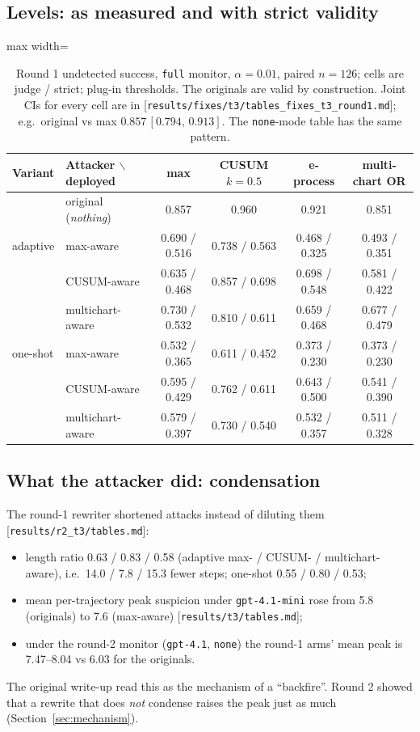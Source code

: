 \documentclass[11pt]{article}
\newcommand{\src}[1]{{\footnotesize\textcolor{ink2}{[\nolinkurl{#1}]}}}
\newcommand{\ci}[2]{\,[#1,\,#2]}
\begin{document}
\subsection{Levels: as measured and with strict validity}

\begin{table}[H]\centering\small
\begin{adjustbox}{max width=\linewidth}
\begin{tabular}{@{}llcccc@{}}
\toprule
Variant & Attacker $\backslash$ deployed & max & CUSUM $k{=}0.5$ & e-process & multi-chart OR\\
\midrule
& original (\emph{nothing}) & 0.857 & 0.960 & 0.921 & 0.851\\
\midrule
adaptive & max-aware & 0.690 / 0.516 & 0.738 / 0.563 & 0.468 / 0.325 & 0.493 / 0.351\\
& CUSUM-aware & 0.635 / 0.468 & 0.857 / 0.698 & 0.698 / 0.548 & 0.581 / 0.422\\
& multichart-aware & 0.730 / 0.532 & 0.810 / 0.611 & 0.659 / 0.468 & 0.677 / 0.479\\
\midrule
one-shot & max-aware & 0.532 / 0.365 & 0.611 / 0.452 & 0.373 / 0.230 & 0.373 / 0.230\\
& CUSUM-aware & 0.595 / 0.429 & 0.762 / 0.611 & 0.643 / 0.500 & 0.541 / 0.390\\
& multichart-aware & 0.579 / 0.397 & 0.730 / 0.540 & 0.532 / 0.357 & 0.511 / 0.328\\
\bottomrule
\end{tabular}
\end{adjustbox}
\caption{Round 1 undetected success, \texttt{full} monitor, $\alpha=0.01$, paired $n=126$; cells are judge / strict; plug-in thresholds. The originals are valid by construction. Joint CIs for every cell are in \src{results/fixes/t3/tables_fixes_t3_round1.md}; e.g.\ original vs max $0.857\ci{0.794}{0.913}$. The \texttt{none}-mode table has the same pattern.}\label{tab:r1levels}
\end{table}


\subsection{What the attacker did: condensation}
The round-1 rewriter shortened attacks instead of diluting them \src{results/r2_t3/tables.md}:
\begin{itemize}
\item length ratio 0.63 / 0.83 / 0.58 (adaptive max- / CUSUM- / multichart-aware), i.e.\ 14.0 / 7.8 / 15.3 fewer steps; one-shot 0.55 / 0.80 / 0.53;
\item mean per-trajectory peak suspicion under \texttt{gpt-4.1-mini} rose from 5.8 (originals) to 7.6 (max-aware) \src{results/t3/tables.md};
\item under the round-2 monitor (\texttt{gpt-4.1}, \texttt{none}) the round-1 arms' mean peak is 7.47--8.04 vs 6.03 for the originals.
\end{itemize}
The original write-up read this as the mechanism of a ``backfire''. Round 2 showed that a rewrite that does \emph{not} condense raises the peak just as much (Section~\ref{sec:mechanism}).
\end{document}
